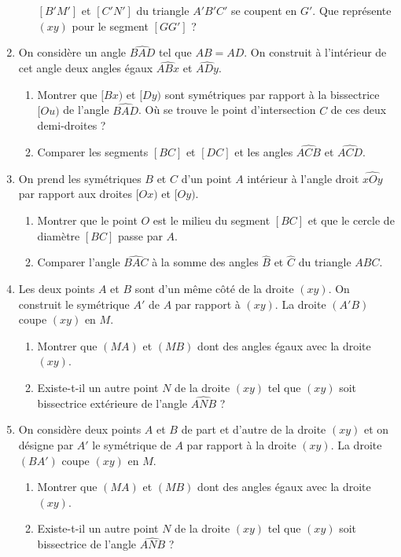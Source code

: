 \documentclass[12 pt]{report}
\theoremstyle{plain}
\newcounter{n}
\begin{document}
\begin{enumerate}
\begin{enumerate}
$[B'M']$ et $[C'N']$ du triangle $A'B'C'$ se coupent en $G'$. Que représente $(xy)$
pour le segment $[GG']$ ? 
\end{enumerate}
\item On considère un angle $\widehat{BAD}$ tel que $AB=AD$. On construit à l'intérieur de cet angle deux angles égaux $\widehat{ABx}$ et $\widehat{ADy}$.
\begin{enumerate}
\item Montrer que $[Bx)$ et $[Dy)$ sont symétriques par rapport à la bissectrice $[Ou)$ de l'angle $\widehat{BAD}$. Où se trouve le point d'intersection $C$ de ces
deux demi-droites ? 
\item Comparer les segments $[BC]$ et $[DC]$ et les angles $\widehat{ACB}$ et $\widehat{ACD}$.
\end{enumerate}
\item On prend les symétriques $B$ et $C$ d'un point $A$ intérieur à l'angle droit $\widehat{xOy}$ par rapport aux droites $[Ox)$ et $[Oy)$. \begin{enumerate}
\item Montrer que le point $O$ est le milieu du segment $[BC]$ et que le 
cercle de diamètre $[BC]$ passe par $A$. 
\item Comparer l'angle $\widehat{BAC}$ à la somme des angles $\widehat{B}$ et $\widehat{C}$ du triangle
$ABC$.
\end{enumerate}
\item Les deux points $A$ et $B$ sont d'un même côté de la droite $(xy)$. On construit le symétrique $A'$ de $A$ par rapport à $(xy)$. La droite $(A'B)$ coupe 
$(xy)$ en $M$. \begin{enumerate}
\item Montrer que $(MA)$ et $(MB)$ dont des angles égaux avec la droite $(xy)$.
\item Existe-t-il un autre point $N$ de la droite $(xy)$ tel que $(xy)$ soit
bissectrice extérieure de l'angle $\widehat{ANB}$ ? 
\end{enumerate}
\item On considère deux points $A$ et $B$ de part et d'autre de la droite $(xy)$
et on désigne par $A'$ le symétrique de $A$ par rapport à la droite $(xy)$.
La droite $(BA')$ coupe $(xy)$ en $M$.  \begin{enumerate}
\item Montrer que $(MA)$ et $(MB)$ dont des angles égaux avec la droite $(xy)$.
\item Existe-t-il un autre point $N$ de la droite $(xy)$ tel que $(xy)$ soit
bissectrice de l'angle $\widehat{ANB}$ ? 

\end{enumerate}
\end{enumerate}
\end{document}
